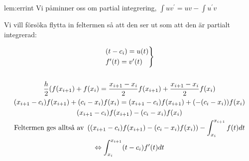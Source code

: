 \begin{lem}{lem:errint}
  \noindent Vi påminner oss om partial integrering, $\int uv^{\prime}= uv - \int u^{\prime}v$
  \par\bigskip
  \noindent Vi vill försöka flytta in feltermen så att den ser ut som att den är partialt integrerad:

  \begin{equation*}
    \begin{gathered}
      \begin{rcases*}
        (t-c_i) = u(t)\\
        f^{\prime}(t) = v^{\prime}(t)
      \end{rcases*}\\\\
      \dfrac{h}{2}(f(x_{i+1})+f(x_i) = \dfrac{x_{i+1}-x_i}{2}f(x_{i+1})+\dfrac{x_{i+1}-x_i}{2}f(x_i)\\
      (x_{i+1}-c_i)f(x_{i+1})+(c_i-x_i)f(x_i) = (x_{i+1}-c_i)f(x_{i+1})+(-(c_i-x_i))f(x_i)\\
      (x_{i+1}-c_i)f(x_{i+1})-(c_i-x_i)f(x_i)\\
      \text{Feltermen ges alltså av } \left((x_{i+1}-c_i)f(x_{i+1})-(c_i-x_i)f(x_i)\right) - \int_{x_i}^{x_{i+1}}f(t)dt\\
      \Lrarr \int_{x_i}^{x_{i+1}}(t-c_i)f^{\prime}(t)dt
    \end{gathered}
  \end{equation*}
 
\end{lem}
\pagebreak

